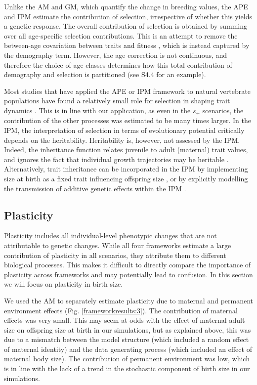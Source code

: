 Unlike the AM and GM, which quantify the change in breeding values, the APE and IPM estimate the contribution of selection, irrespective of whether this yields a genetic response. The overall contribution of selection is obtained by summing over all age-specific selection contributions. This is an attempt to remove the between-age covariation between traits and fitness \parencite{engen2014b}, which is instead captured by the demography term. However, the age correction is not continuous, and therefore the choice of age classes determines how this total contribution of demography and selection is partitioned (see S4.4 for an example).

Most studies that have applied the APE or IPM framework to natural vertebrate populations have found a relatively small role for selection in shaping trait dynamics \parencite[e.g.][]{Ozgul2009,traill2014demography}. This is in line with our application, as even in the $s_+$ scenarios, the contribution of the other processes was estimated to be many times larger. In the IPM, the interpretation of selection in terms of evolutionary potential critically depends on the heritability. Heritability is, however, not assessed by the IPM. Indeed, the inheritance function relates juvenile to adult (maternal) trait values, and ignores the fact that individual growth trajectories may be heritable \parencite{chevin2015}. Alternatively, trait inheritance can be incorporated in the IPM by implementing size at birth as a fixed trait influencing offspring size \parencite{vindenes2015}, or by explicitly modelling the transmission of additive genetic effects within the IPM \parencite{Coulson2015,Childs2016}.

\subsection*{Plasticity}
Plasticity includes all individual-level phenotypic changes that are not attributable to genetic changes. While all four frameworks estimate a large contribution of plasticity in all scenarios, they attribute them to different biological processes. This makes it difficult to directly compare the importance of plasticity across frameworks and may potentially lead to confusion. In this section we will focus on plasticity in birth size.

We used the AM to separately estimate plasticity due to maternal and permanent environment effects (Fig. \ref{frameworkresults:3}). The contribution of maternal effects was very small. This may seem at odds with the effect of maternal adult size on offspring size at birth in our simulations, but as explained above, this was due to a mismatch between the model structure (which included a random effect of maternal identity) and the data generating process  (which included an effect of maternal body size). The contribution of permanent environment was low, which is in line with the lack of a trend in the stochastic component of birth size in our simulations.

